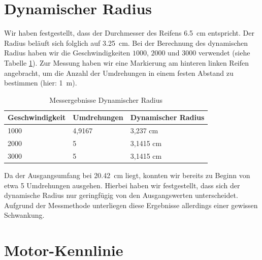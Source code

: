 \documentclass[10pt]{article}
\begin{document}
\section{Dynamischer Radius}
    Wir haben festgestellt, dass der Durchmesser des Reifens \SI{6,5}{\cm} entspricht.
    Der Radius beläuft sich folglich auf \SI{3,25}{\cm}.
    Bei der Berechnung des dynamischen Radius haben wir die Geschwindigkeiten $1000$, $2000$ und $3000$ verwendet (siehe Tabelle \ref{tab:dynamicradius}).
    Zur Messung haben wir eine Markierung am hinteren linken Reifen angebracht, um die Anzahl der Umdrehungen in einem festen Abstand zu bestimmen (hier: \SI{1}{m}).
    \begin{table}[bthp]
        \caption{Messergebnisse Dynamischer Radius}
        \label{tab:dynamicradius}
        \centering
        \begin{tabular}{|l|l|l|}
        Geschwindigkeit & Umdrehungen & Dynamischer Radius \\ \hline
        1000            & 4,9167      & 3,237 cm           \\
        2000            & 5           & 3,1415 cm          \\
        3000            & 5           & 3,1415 cm
        \end{tabular}
    \end{table}
    Da der Ausgangsumfang bei \SI{20,42}{\cm} liegt, konnten wir bereits zu Beginn von etwa 5 Umdrehungen ausgehen.
    Hierbei haben wir festgestellt, dass sich der dynamische Radius nur geringfügig von den Ausgangswerten unterscheidet.
    Aufgrund der Messmethode unterliegen diese Ergebnisse allerdings einer gewissen Schwankung.

\section{Motor-Kennlinie}
\end{document}

